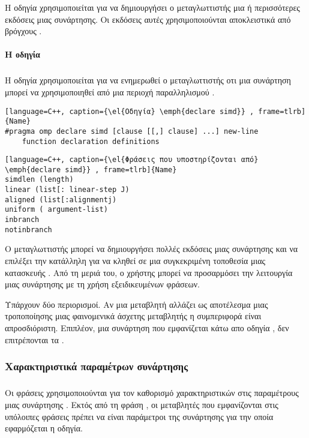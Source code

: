 Η οδηγία \emph{} χρησιμοποιείται για να δημιουργήσει ο μεταγλωττιστής μια ή περισσότερες \emph{} εκδόσεις μιας συνάρτησης. Οι εκδόσεις αυτές χρησιμοποιούνται αποκλειστικά από βρόγχους \emph{}.


\paragraph{H οδηγία \emph{}}
\subparagraph{}
Η οδηγία \emph{} χρησιμοποιείται για να ενημερωθεί ο μεταγλωττιστής οτι μια συνάρτηση μπορεί να χρησιμοποιηθεί από μια περιοχή παραλληλισμού \emph{}.

\begin{lstlisting}[language=C++, caption={\el{Οδηγία} \emph{declare simd}} , frame=tlrb]{Name}
#pragma omp declare simd [clause [[,] clause] ...] new-line
	function declaration definitions
\end{lstlisting}

\begin{lstlisting}[language=C++, caption={\el{Φράσεις που υποστηρίζονται από} \emph{declare simd}} , frame=tlrb]{Name}
simdlen (length)
linear (list[: linear-step J)
aligned (list[:alignmentj)
uniform ( argument-list)
inbranch
notinbranch
\end{lstlisting}

Ο μεταγλωττιστής μπορεί να δημιουργήσει πολλές \emph{} εκδόσεις  μιας συνάρτησης και να επιλέξει την κατάλληλη για να κληθεί σε μια συγκεκριμένη τοποθεσία μιας κατασκευής \emph{}. Από τη μεριά του, ο χρήστης μπορεί να προσαρμόσει την λειτουργία μιας συνάρτησης με τη χρήση εξειδικευμένων φράσεων.

Υπάρχουν δύο περιορισμοί. Αν μια μεταβλητή αλλάζει ως αποτέλεσμα μιας τροποποίησης μιας φαινομενικά άσχετης μεταβλητής η συμπεριφορά είναι απροσδιόριστη. Επιπλέον, μια συνάρτηση που εμφανίζεται κάτω απο οδηγία \emph{}, δεν επιτρέπονται τα \emph{}.



\subsubsection{Χαρακτηριστικά παραμέτρων συνάρτησης \emph{}}
\subparagraph{}
Οι φράσεις \emph{} χρησιμοποιούνται για τον καθορισμό χαρακτηριστικών στις παραμέτρους μιας συνάρτησης \emph{}. Εκτός από τη φράση \emph{}, οι μεταβλητές που εμφανίζονται στις υπόλοιπες φράσεις πρέπει να είναι παράμετροι της συνάρτησης για την οποία εφαρμόζεται η οδηγία.


